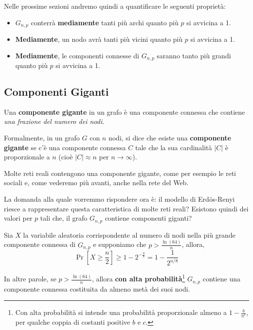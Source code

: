  Nelle prossime sezioni andremo quindi a quantificare le seguenti proprietà:
\begin{itemize}[label={-}]
    \item $G_{n,p}$ conterrà \textbf{mediamente} tanti più archi quanto più $p$ si avvicina a 1.
    \item \textbf{Mediamente}, un nodo avrà tanti più vicini quanto più $p$ si avvicina a 1.
    \item \textbf{Mediamente}, le componenti connesse di $G_{n,p}$ saranno tanto più grandi quanto più $p$ si avvicina a 1.
\end{itemize}

\subsection{Componenti Giganti}

\begin{definizione}
    Una \textbf{componente gigante} in un grafo è una componente connessa che contiene \textit{una frazione del numero dei nodi}.
    
     Formalmente, in un grafo $G$ con $n$ nodi, si dice che esiste una \textbf{componente gigante} se c'è una componente connessa $C$ tale che la sua cardinalità $|C|$ è proporzionale a $n$ (cioè $|C| \approx n$ per $n \rightarrow \infty$).
\end{definizione}

\vspace{0.5cm}

 Molte reti reali contengono una componente gigante, come per esempio le reti sociali e, come vederemo più avanti, anche nella rete del Web.

La domanda alla quale vorremmo rispondere ora è: il modello di Erd\"os-Renyi riesce a rappresentare questa caratteristica di molte reti reali? Esistono quindi dei valori per $p$ tali che, il grafo $G_{n,p}$ contiene componenti giganti?

\begin{teorema}\label{theoem1.1}
    Sia $X$ la variabile aleatoria corrispondente al numero di nodi nella più grande componente connessa di $G_{n,p}$ e supponiamo che $p > \frac{\ln(64)}{n}$, allora,
    \[
    \Pr[X \geq \frac{n}{2}] \geq 1 - 2^{-\frac{n}{8}} = 1 - \frac{1}{2^{n/8}}
    \]
\end{teorema}

 In altre parole, se $p > \frac{\ln(64)}{n}$, allora \textbf{con alta probabilità}\footnote{Con alta probabilità si intende una probabilità proporzionale almeno a $1 - \frac{b}{n^c}$, per qualche coppia di costanti positive $b$ e $c$.} $G_{n,p}$ contiene una componente connessa costituita da almeno metà dei suoi nodi.
    
